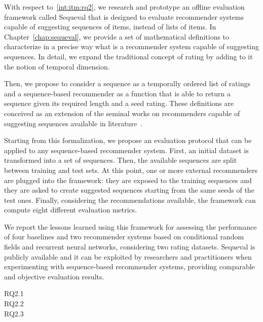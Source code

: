 With respect to~\ref{int:itm:rq2}, we research and prototype an offline evaluation framework called Sequeval that is designed to evaluate recommender systems capable of suggesting sequences of items, instead of lists of items. In Chapter~\ref{chap:sequeval}, we provide a set of mathematical definitions to characterize in a precise way what is a recommender system capable of suggesting sequences. In detail, we expand the traditional concept of rating by adding to it the notion of temporal dimension.

Then, we propose to consider a sequence as a temporally ordered list of ratings and a sequence-based recommender as a function that is able to return a sequence given its required length and a seed rating. These definitions are conceived as an extension of the seminal works on recommenders capable of suggesting sequences available in literature~\cite{Quadrana2018}.

Starting from this formalization, we propose an evaluation protocol that can be applied to any sequence-based recommender system. First, an initial dataset is transformed into a set of sequences. Then, the available sequences are split between training and test sets. At this point, one or more external recommenders are plugged into the framework: they are exposed to the training sequences and they are asked to create suggested sequences starting from the same seeds of the test ones. Finally, considering the recommendations available, the framework can compute eight different evaluation metrics.

We report the lessons learned using this framework for assessing the performance of four baselines and two recommender systems based on conditional random fields and recurrent neural networks, considering two rating datasets. Sequeval is publicly available and it can be exploited by researchers and practitioners when experimenting with sequence-based recommender systems, providing comparable and objective evaluation results. 

\begin{description}
\item[RQ2.1] 
\item[RQ2.2] 
\item[RQ2.3] 
\end{description}

